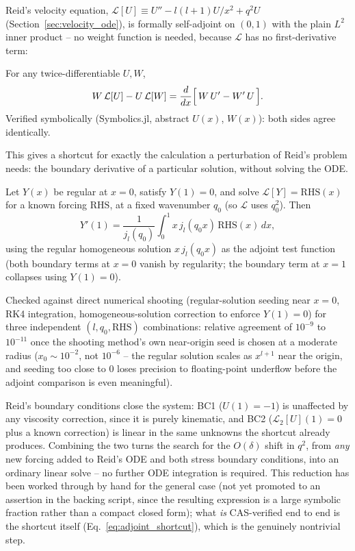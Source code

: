 Reid's velocity equation, $\mathcal{L}[U]\equiv U''-l(l+1)U/x^2+q^2U$
(Section~\ref{sec:velocity_ode}), is formally self-adjoint on $(0,1)$ with
the plain $L^2$ inner product -- no weight function is needed, because
$\mathcal{L}$ has no first-derivative term:
\begin{derivbox}
For any twice-differentiable $U,W$,
\begin{equation}
  W\,\mathcal{L}[U] - U\,\mathcal{L}[W]
  = \frac{d}{dx}\Bigl[\,W\,U' - W'\,U\,\Bigr].
  \label{eq:lagrange}
\end{equation}
Verified symbolically (Symbolics.jl, abstract $U(x)$, $W(x)$): both sides
agree identically.
\end{derivbox}

This gives a shortcut for exactly the calculation a perturbation of Reid's
problem needs: the boundary derivative of a particular solution, without
solving the ODE.

\begin{keybox}
Let $Y(x)$ be regular at $x=0$, satisfy $Y(1)=0$, and solve
$\mathcal{L}[Y]=\mathrm{RHS}(x)$ for a known forcing $\mathrm{RHS}$, at a
fixed wavenumber $q_0$ (so $\mathcal{L}$ uses $q_0^2$). Then
\begin{equation}
  Y'(1) = \frac{1}{j_l(q_0)}\int_0^1 x\,j_l(q_0x)\,\mathrm{RHS}(x)\,dx,
  \label{eq:adjoint_shortcut}
\end{equation}
using the regular homogeneous solution $x\,j_l(q_0x)$ as the adjoint test
function (both boundary terms at $x=0$ vanish by regularity; the boundary
term at $x=1$ collapses using $Y(1)=0$).
\end{keybox}

\begin{notebox}
Checked against direct numerical shooting (regular-solution seeding near
$x=0$, RK4 integration, homogeneous-solution correction to enforce
$Y(1)=0$) for three independent $(l,q_0,\mathrm{RHS})$ combinations: relative
agreement of $10^{-9}$ to $10^{-11}$ once the shooting method's own
near-origin seed is chosen at a moderate radius ($x_0\sim 10^{-2}$, not
$10^{-6}$ -- the regular solution scales as $x^{l+1}$ near the origin, and
seeding too close to $0$ loses precision to floating-point underflow before
the adjoint comparison is even meaningful).
\end{notebox}

Reid's boundary conditions close the system: BC1 ($U(1)=-1$) is unaffected
by any viscosity correction, since it is purely kinematic, and BC2
($\mathcal L_2[U](1)=0$ plus a known correction) is linear in the same
unknowns the shortcut already produces. Combining the two turns the search
for the $O(\delta)$ shift in $q^2$, from \emph{any} new forcing added to
Reid's ODE and both stress boundary conditions, into an ordinary linear
solve -- no further ODE integration is required. This reduction has been
worked through by hand for the general case (not yet promoted to an
assertion in the backing script, since the resulting expression is a large
symbolic fraction rather than a compact closed form); what \emph{is}
CAS-verified end to end is the shortcut itself
(Eq.~\ref{eq:adjoint_shortcut}), which is the genuinely nontrivial step.

